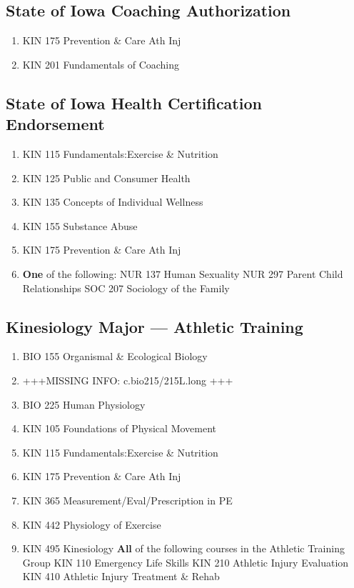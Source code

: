 \documentclass[
  letterpaper,
]{scrbook}
\providecommand{\tightlist}{%
  \setlength{\itemsep}{0pt}\setlength{\parskip}{0pt}}
\begin{document}
\hypertarget{state-of-iowa-coaching-authorization}{%
\subsection{State of Iowa Coaching
Authorization}\label{state-of-iowa-coaching-authorization}}

\begin{enumerate}
\def\labelenumi{\arabic{enumi}.}
\tightlist
\item
  KIN 175 Prevention \& Care Ath Inj
\item
  KIN 201 Fundamentals of Coaching
\end{enumerate}

\hypertarget{state-of-iowa-health-certification-endorsement}{%
\subsection{State of Iowa Health Certification
Endorsement}\label{state-of-iowa-health-certification-endorsement}}

\begin{enumerate}
\def\labelenumi{\arabic{enumi}.}
\tightlist
\item
  KIN 115 Fundamentals:Exercise \& Nutrition
\item
  KIN 125 Public and Consumer Health
\item
  KIN 135 Concepts of Individual Wellness
\item
  KIN 155 Substance Abuse
\item
  KIN 175 Prevention \& Care Ath Inj
\item
  \textbf{One} of the following: NUR 137 Human Sexuality NUR 297 Parent
  Child Relationships SOC 207 Sociology of the Family
\end{enumerate}

\hypertarget{kinesiology-major-athletic-training}{%
\subsection{Kinesiology Major --- Athletic
Training}\label{kinesiology-major-athletic-training}}

\begin{enumerate}
\def\labelenumi{\arabic{enumi}.}
\tightlist
\item
  BIO 155 Organismal \& Ecological Biology
\item
  +++MISSING INFO: c.bio215/215L.long +++
\item
  BIO 225 Human Physiology
\item
  KIN 105 Foundations of Physical Movement
\item
  KIN 115 Fundamentals:Exercise \& Nutrition
\item
  KIN 175 Prevention \& Care Ath Inj
\item
  KIN 365 Measurement/Eval/Prescription in PE
\item
  KIN 442 Physiology of Exercise
\item
  KIN 495 Kinesiology \textbf{All} of the following courses in the
  Athletic Training Group KIN 110 Emergency Life Skills KIN 210 Athletic
  Injury Evaluation KIN 410 Athletic Injury Treatment \& Rehab
\end{enumerate}
\end{document}
